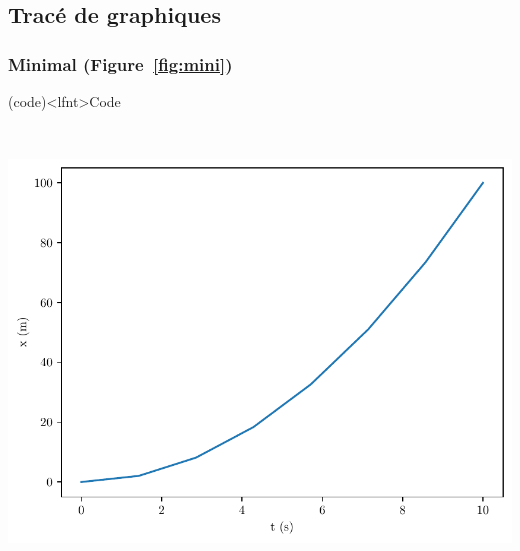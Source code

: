 \documentclass[a4paper, 12pt, garamond]{book}
\begin{document}
\vspace*{-20pt}
\subsection{Tracé de graphiques}
\subsubsection{Minimal (Figure~\ref{fig:mini})}
\begin{tcb}(code)<lfnt>{Code}
	\vspace{-10pt}
	\vspace*{-20pt}
\end{tcb}

\vspace{-15pt}
\noindent
\begin{minipage}[t]{.48\linewidth}
	~
	\begin{center}
		\includegraphics[width=\linewidth]{figures/python_plt-1}
		\label{fig:mini}
	\end{center}
\end{minipage}
\hfill
\end{document}
